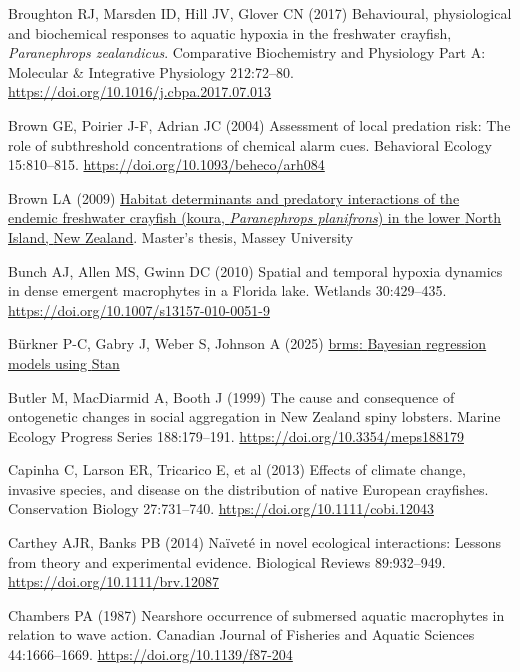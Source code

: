 \documentclass[
  12pt,
  a4paper,
]{scrbook}
\newlength{\cslhangindent}
\newenvironment{CSLReferences}[2] %
 {\begin{list}{}{%
  \setlength{\itemindent}{0pt}
  \setlength{\leftmargin}{0pt}
  \setlength{\parsep}{0pt}
  \ifodd #1
   \setlength{\leftmargin}{\cslhangindent}
   \setlength{\itemindent}{-1\cslhangindent}
  \fi
  \setlength{\itemsep}{#2\baselineskip}}}
 {\end{list}}
\begin{document}
\begin{CSLReferences}{1}{1}
Broughton RJ, Marsden ID, Hill JV, Glover CN (2017) Behavioural,
physiological and biochemical responses to aquatic hypoxia in the
freshwater crayfish, {\emph{Paranephrops zealandicus}}. Comparative
Biochemistry and Physiology Part A: Molecular \& Integrative Physiology
212:72--80. \url{https://doi.org/10.1016/j.cbpa.2017.07.013}

Brown GE, Poirier J-F, Adrian JC (2004) Assessment of local predation
risk: The role of subthreshold concentrations of chemical alarm cues.
Behavioral Ecology 15:810--815.
\url{https://doi.org/10.1093/beheco/arh084}

Brown LA (2009) \href{http://hdl.handle.net/10179/1168}{Habitat
determinants and predatory interactions of the endemic freshwater
crayfish (koura, {\emph{Paranephrops planifrons}}) in the lower {North
Island}, {New Zealand}}. Master's thesis, Massey University

Bunch AJ, Allen MS, Gwinn DC (2010) Spatial and temporal hypoxia
dynamics in dense emergent macrophytes in a {Florida} lake. Wetlands
30:429--435. \url{https://doi.org/10.1007/s13157-010-0051-9}

Bürkner P-C, Gabry J, Weber S, Johnson A (2025)
\href{https://cran.r-project.org/web/packages/brms/index.html}{{brms}:
{Bayesian} regression models using {Stan}}

Butler M, MacDiarmid A, Booth J (1999) The cause and consequence of
ontogenetic changes in social aggregation in {New Zealand} spiny
lobsters. Marine Ecology Progress Series 188:179--191.
\url{https://doi.org/10.3354/meps188179}

Capinha C, Larson ER, Tricarico E, et al (2013) Effects of climate
change, invasive species, and disease on the distribution of native
{European} crayfishes. Conservation Biology 27:731--740.
\url{https://doi.org/10.1111/cobi.12043}

Carthey AJR, Banks PB (2014) Naïveté in novel ecological interactions:
Lessons from theory and experimental evidence. Biological Reviews
89:932--949. \url{https://doi.org/10.1111/brv.12087}

Chambers PA (1987) Nearshore occurrence of submersed aquatic macrophytes
in relation to wave action. Canadian Journal of Fisheries and Aquatic
Sciences 44:1666--1669. \url{https://doi.org/10.1139/f87-204}


\end{CSLReferences}
\end{document}
